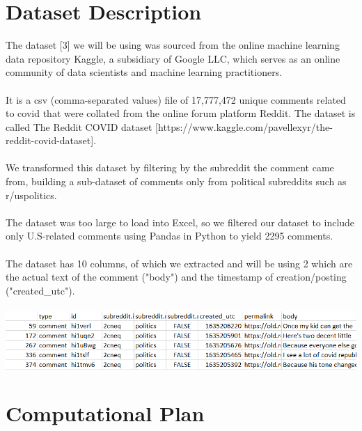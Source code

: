\documentclass[fontsize=11pt]{article}
\begin{document}
\section*{Dataset Description}

The dataset [3] we will be using was sourced from the online machine learning data repository Kaggle, a subsidiary of Google LLC, which serves as an online community of data scientists and machine learning practitioners.
\\\\
It is a csv (comma-separated values) file of 17,777,472 unique comments related to covid that were collated from the online forum platform Reddit. The dataset is called The Reddit COVID dataset [https://www.kaggle.com/pavellexyr/the-reddit-covid-dataset].
\\\\
We transformed this dataset by filtering by the subreddit the comment came from, building a sub-dataset of comments only from political subreddits such as r/uspolitics.
\\\\
The dataset was too large to load into Excel, so we filtered our dataset to include only U.S-related comments using Pandas in Python to yield 2295 comments.
\\\\
The dataset has 10 columns, of which we extracted and will be using 2 which are the actual text of the comment ("body") and the timestamp of creation/posting ("created\_utc"). \\\\
\includegraphics{rows.png}

\section*{Computational Plan}
\end{document}
